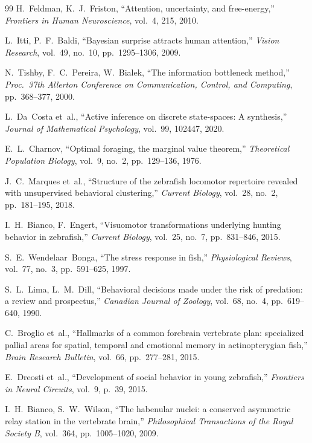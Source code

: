 \documentclass[11pt,a4paper]{article}
\begin{document}
\begin{thebibliography}{99}
  H.~Feldman, K.~J.~Friston,
  ``Attention, uncertainty, and free-energy,''
  \textit{Frontiers in Human Neuroscience}, vol.~4, 215, 2010.

  L.~Itti, P.~F.~Baldi,
  ``Bayesian surprise attracts human attention,''
  \textit{Vision Research}, vol.~49, no.~10, pp.~1295--1306, 2009.

  N.~Tishby, F.~C.~Pereira, W.~Bialek,
  ``The information bottleneck method,''
  \textit{Proc.\ 37th Allerton Conference on Communication, Control,
  and Computing}, pp.~368--377, 2000.

  L.~Da~Costa et~al.,
  ``Active inference on discrete state-spaces:
  A synthesis,''
  \textit{Journal of Mathematical Psychology}, vol.~99, 102447, 2020.

  E.~L.~Charnov,
  ``Optimal foraging, the marginal value theorem,''
  \textit{Theoretical Population Biology}, vol.~9, no.~2, pp.~129--136, 1976.

  J.~C.~Marques et~al.,
  ``Structure of the zebrafish locomotor repertoire revealed with
  unsupervised behavioral clustering,''
  \textit{Current Biology}, vol.~28, no.~2, pp.~181--195, 2018.

  I.~H.~Bianco, F.~Engert,
  ``Visuomotor transformations underlying hunting behavior in zebrafish,''
  \textit{Current Biology}, vol.~25, no.~7, pp.~831--846, 2015.

  S.~E.~Wendelaar~Bonga,
  ``The stress response in fish,''
  \textit{Physiological Reviews}, vol.~77, no.~3, pp.~591--625, 1997.

  S.~L.~Lima, L.~M.~Dill,
  ``Behavioral decisions made under the risk of predation: a review and prospectus,''
  \textit{Canadian Journal of Zoology}, vol.~68, no.~4, pp.~619--640, 1990.

  C.~Broglio et~al.,
  ``Hallmarks of a common forebrain vertebrate plan: specialized pallial areas for spatial, temporal and emotional memory in actinopterygian fish,''
  \textit{Brain Research Bulletin}, vol.~66, pp.~277--281, 2015.

  E.~Dreosti et~al.,
  ``Development of social behavior in young zebrafish,''
  \textit{Frontiers in Neural Circuits}, vol.~9, p.~39, 2015.

  I.~H.~Bianco, S.~W.~Wilson,
  ``The habenular nuclei: a conserved asymmetric relay station in the vertebrate brain,''
  \textit{Philosophical Transactions of the Royal Society B}, vol.~364, pp.~1005--1020, 2009.


\end{thebibliography}
\end{document}
